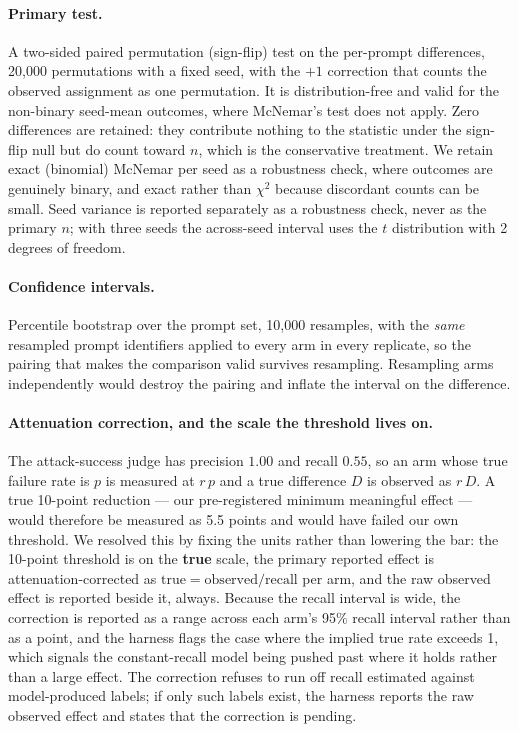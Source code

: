 \paragraph{Primary test.} A two-sided paired permutation (sign-flip) test on the
per-prompt differences, 20{,}000 permutations with a fixed seed, with the $+1$ correction
that counts the observed assignment as one permutation. It is distribution-free and valid
for the non-binary seed-mean outcomes, where McNemar's test does not apply. Zero
differences are retained: they contribute nothing to the statistic under the sign-flip
null but do count toward $n$, which is the conservative treatment. We retain exact
(binomial) McNemar per seed as a robustness check, where outcomes are genuinely binary,
and exact rather than $\chi^2$ because discordant counts can be small. Seed variance is
reported separately as a robustness check, never as the primary $n$; with three seeds the
across-seed interval uses the $t$ distribution with 2 degrees of freedom.

\paragraph{Confidence intervals.} Percentile bootstrap over the prompt set, 10{,}000
resamples, with the \emph{same} resampled prompt identifiers applied to every arm in every
replicate, so the pairing that makes the comparison valid survives resampling. Resampling
arms independently would destroy the pairing and inflate the interval on the difference.

\paragraph{Attenuation correction, and the scale the threshold lives on.} The
attack-success judge has precision $1.00$ and recall $0.55$, so an arm whose true failure
rate is $p$ is measured at $r\,p$ and a true difference $D$ is observed as $r\,D$. A true
10-point reduction --- our pre-registered minimum meaningful effect --- would therefore be
measured as 5.5 points and would have failed our own threshold. We resolved this by fixing
the units rather than lowering the bar: the 10-point threshold is on the \textbf{true}
scale, the primary reported effect is attenuation-corrected as
$\text{true} = \text{observed}/\text{recall}$ per arm, and the raw observed effect is
reported beside it, always. Because the recall interval is wide, the correction is reported
as a range across each arm's 95\% recall interval rather than as a point, and the harness
flags the case where the implied true rate exceeds 1, which signals the constant-recall
model being pushed past where it holds rather than a large effect. The correction refuses
to run off recall estimated against model-produced labels; if only such labels exist, the
harness reports the raw observed effect and states that the correction is pending.

